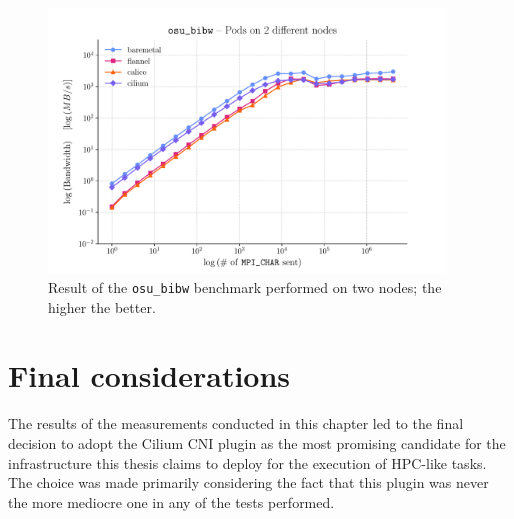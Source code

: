 
\begin{figure}[H]
  \centering
  \includegraphics[width=0.94\textwidth]{img/chpt3/bibw-2-nodes}
  \caption{Result of the \texttt{osu\_bibw} benchmark performed on two nodes; the
    higher the better.}
  \label{fig:bibw-2-nodes}
\end{figure}

\section{Final considerations}\label{sec:final-considerations}

The results of the measurements conducted in this chapter led to the final
decision to adopt the Cilium CNI plugin as the most promising candidate for the
infrastructure this thesis claims to deploy for the execution of HPC-like tasks.
The choice was made primarily considering the fact that this plugin was never
the more mediocre one in any of the tests performed.

